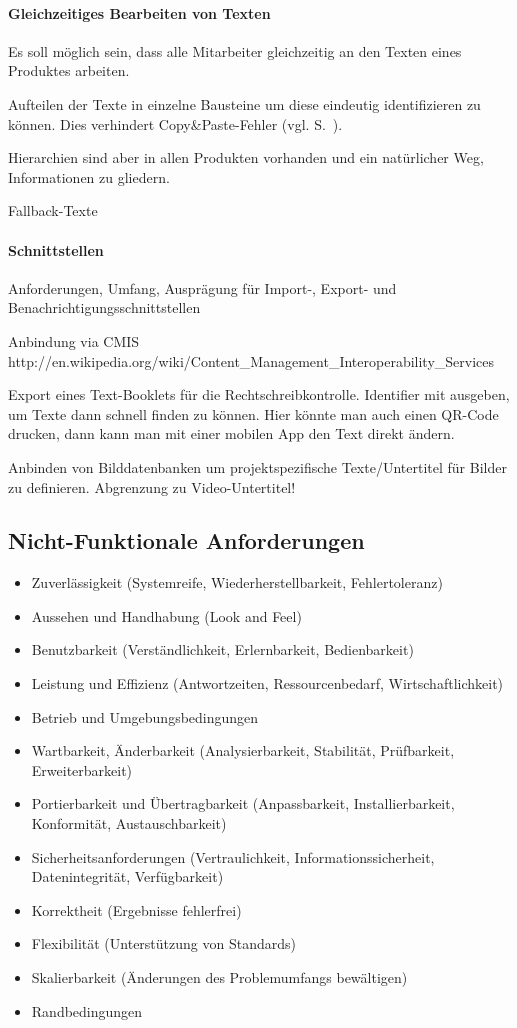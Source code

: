\paragraph{Gleichzeitiges Bearbeiten von Texten} Es soll möglich sein, dass alle  Mitarbeiter gleichzeitig an den Texten eines Produktes arbeiten.


Aufteilen der Texte in einzelne Bausteine um diese eindeutig identifizieren zu können. Dies verhindert Copy\&Paste-Fehler (vgl. S.~\pageref{p:serielles-konzept}).

\label{l:hierarchien} Hierarchien sind aber in allen Produkten vorhanden und ein natürlicher Weg, Informationen zu gliedern. 

Fallback-Texte

\paragraph{Schnittstellen}

Anforderungen, Umfang, Ausprägung für Import-, Export- und Benachrichtigungsschnittstellen

Anbindung via CMIS http://en.wikipedia.org/wiki/Content\_Management\_Interoperability\_Services

Export eines Text-Booklets für die Rechtschreibkontrolle. Identifier mit ausgeben, um Texte dann schnell finden zu können. Hier könnte man auch einen QR-Code drucken, dann kann man mit einer mobilen App den Text direkt ändern.

Anbinden von Bilddatenbanken um projektspezifische Texte/Untertitel für Bilder zu definieren. Abgrenzung zu Video-Untertitel!

\subsection{Nicht-Funktionale Anforderungen}

\begin{itemize}
\item Zuverlässigkeit (Systemreife, Wiederherstellbarkeit, Fehlertoleranz)
\item Aussehen und Handhabung (Look and Feel)
\item Benutzbarkeit (Verständlichkeit, Erlernbarkeit, Bedienbarkeit)
\item Leistung und Effizienz (Antwortzeiten, Ressourcenbedarf, Wirtschaftlichkeit)
\item Betrieb und Umgebungsbedingungen
\item Wartbarkeit, Änderbarkeit (Analysierbarkeit, Stabilität, Prüfbarkeit, Erweiterbarkeit)
\item Portierbarkeit und Übertragbarkeit (Anpassbarkeit, Installierbarkeit, Konformität, Austauschbarkeit)
\item Sicherheitsanforderungen (Vertraulichkeit, Informationssicherheit, Datenintegrität, Verfügbarkeit)
\item Korrektheit (Ergebnisse fehlerfrei)
\item Flexibilität (Unterstützung von Standards)
\item Skalierbarkeit (Änderungen des Problemumfangs bewältigen)
\item Randbedingungen
\end{itemize}
